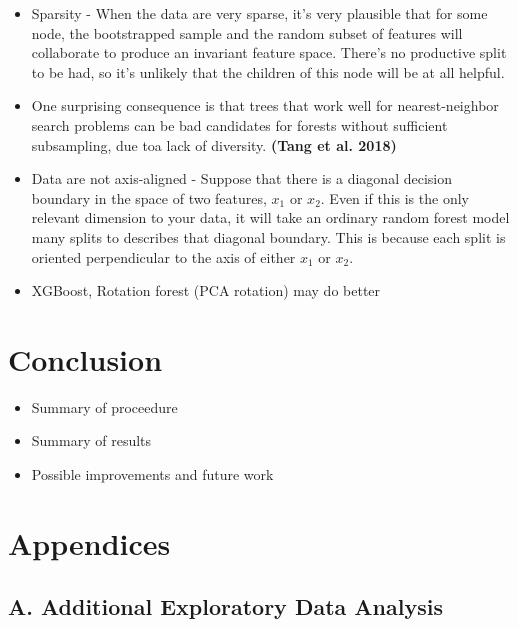 \documentclass[12pt,]{article}
\providecommand{\tightlist}{%
  \setlength{\itemsep}{0pt}\setlength{\parskip}{0pt}}
\begin{document}
\begin{itemize}
\item
  Sparsity - When the data are very sparse, it's very plausible that for
  some node, the bootstrapped sample and the random subset of features
  will collaborate to produce an invariant feature space. There's no
  productive split to be had, so it's unlikely that the children of this
  node will be at all helpful.
\item
  One surprising consequence is that trees that work well for
  nearest-neighbor search problems can be bad candidates for forests
  without sufficient subsampling, due toa lack of diversity.
  \textbf{(Tang et al. 2018)}
\item
  Data are not axis-aligned - Suppose that there is a diagonal decision
  boundary in the space of two features, \(x_1\) or \(x_2\). Even if
  this is the only relevant dimension to your data, it will take an
  ordinary random forest model many splits to describes that diagonal
  boundary. This is because each split is oriented perpendicular to the
  axis of either \(x_1\) or \(x_2\).
\item
  XGBoost, Rotation forest (PCA rotation) may do better
\end{itemize}

\newpage

\section{Conclusion}\label{conclusion}

\begin{itemize}
\tightlist
\item
  Summary of proceedure
\item
  Summary of results
\item
  Possible improvements and future work
\end{itemize}

\newpage

\section{Appendices}\label{appendices}

\subsection{A. Additional Exploratory Data
Analysis}\label{a.-additional-exploratory-data-analysis}
\end{document}
